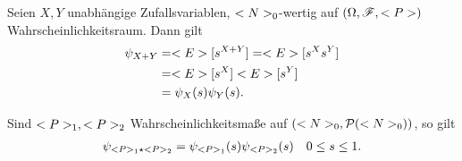 \begin{proposition}
	Seien $X,Y$ unabhängige Zufallsvariablen, $\N_0$-wertig auf $(\O,\F,\P)$ Wahrscheinlichkeitsraum. Dann gilt
	\begin{align*}
		\psi_{X+Y} &= \E[s^{X+Y}] = \E[s^X s^Y]\\
		&= \E[s^X] \E[s^Y]\\
		&= \psi_X (s) \psi_Y (s).
	\end{align*}
\end{proposition}
\begin{proposition}
	Sind $\P_1 , \P_2$ Wahrscheinlichkeitsmaße auf $(\N_0, \pows(\N_0))$, so gilt
	\begin{align*}
		\psi_{\P_1\star \P_2} = \psi_{\P_1}(s) \psi_{\P_2}(s) \quad 0 \le s \le 1.
	\end{align*}
\end{proposition}